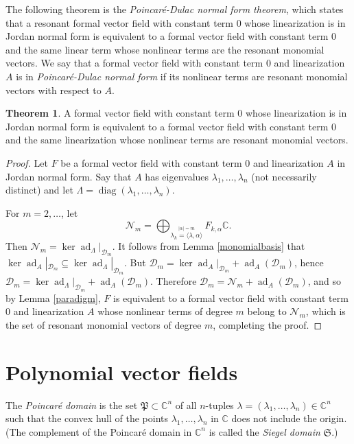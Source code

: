 \documentclass{article}
\theoremstyle{definition}
\newtheorem{theorem}{Theorem}
\newcommand{\diag}{\operatorname{diag}}
\newcommand{\ad}{\operatorname{ad}}
\begin{document}
 The following theorem is the {\em Poincar\'e-Dulac normal form theorem}, which states that a resonant formal vector field with constant term $0$ whose linearization is in Jordan normal form is equivalent to a formal vector field with
constant term $0$ and the same linear term whose nonlinear terms are the resonant monomial vectors. We say that a formal vector field with constant term $0$ and linearization $A$ is in {\em Poincar\'e-Dulac normal form} if its nonlinear terms
are resonant monomial vectors with respect to $A$.

\begin{theorem}
A formal vector field with constant term $0$  whose linearization is in Jordan normal form is equivalent to a formal vector field with constant term $0$ and the same linearization whose nonlinear terms are resonant monomial vectors.
\end{theorem}
\begin{proof}
Let $F$ be a formal vector field with constant term $0$ and linearization $A$ in Jordan normal form. Say
that $A$ has eigenvalues $\lambda_1,\ldots,\lambda_n$ (not necessarily distinct) and let $\Lambda=\diag(\lambda_1,\ldots,\lambda_n)$.

For $m=2,\ldots$, let 
\[
\mathscr{N}_m = \bigoplus_{\stackrel{|\alpha|=m}{\lambda_k=\langle \lambda,\alpha \rangle}}
F_{k,\alpha} \mathbb{C}.
\]
Then $\mathscr{N}_m=\ker \ad_\Lambda|_{\mathscr{D}_m}$.
It follows from Lemma \ref{monomialbasis} that $\ker \ad_A|_{\mathscr{D}_m} \subseteq \ker \ad_\Lambda|_{\mathscr{D}_m}$. But $\mathscr{D}_m=\ker \ad_A|_{\mathscr{D}_m}+\ad_A(\mathscr{D}_m)$, hence $\mathscr{D}_m=\ker \ad_\Lambda|_{\mathscr{D}_m}+\ad_A(\mathscr{D}_m)$.
Therefore $\mathscr{D}_m=\mathscr{N}_m+\ad_A(\mathscr{D}_m)$, and so by Lemma \ref{paradigm}, $F$ is equivalent to a formal vector field with constant term $0$ and linearization $A$ whose nonlinear terms of degree $m$ belong to
$\mathscr{N}_m$, which is the set of resonant monomial vectors of degree $m$, completing the proof.
\end{proof}

\section{Polynomial vector fields}
The {\em Poincar\'e domain} is the set $\mathfrak{P} \subset \mathbb{C}^n$ of all $n$-tuples $\lambda=(\lambda_1,\ldots,\lambda_n) \in \mathbb{C}^n$ such that the convex hull of the points $\lambda_1,\ldots,\lambda_n$  in $\mathbb{C}$  does not include the origin. (The complement of the Poincar\'e domain in $\mathbb{C}^n$ is called the {\em Siegel domain}
$\mathfrak{S}$.)
\end{document}
